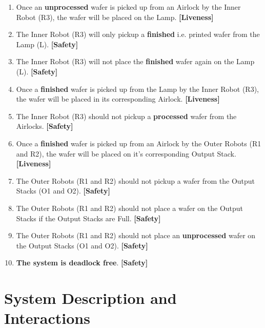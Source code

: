 \documentclass[a4paper,12pt]{article}
\begin{document}
\begin{enumerate}
\begin{enumerate}
		\end{enumerate}
		\item Once an \textbf{unprocessed} wafer is picked up from an Airlock by the Inner Robot (R3), the wafer will be placed on the Lamp. \textbf{[Liveness]}
		\item The Inner Robot (R3) will only pickup a \textbf{finished} i.e. printed wafer from the Lamp (L). \textbf{[Safety]}
		\item The Inner Robot (R3) will not place the \textbf{finished} wafer again on the Lamp (L). \textbf{[Safety]}
		\item Once a \textbf{finished} wafer is picked up from the Lamp by the Inner Robot (R3), the wafer will be placed in its corresponding Airlock. \textbf{[Liveness]}
		\item The Inner Robot (R3) should not pickup a \textbf{processed} wafer from the Airlocks. \textbf{[Safety]}
		\item Once a \textbf{finished} wafer is picked up from an Airlock by the Outer Robots (R1 and R2), the wafer will be placed on it's corresponding Output Stack. \textbf{[Liveness]}
		\item The Outer Robots (R1 and R2) should not pickup a wafer from the Output Stacks (O1 and O2). \textbf{[Safety]}
		\item The Outer Robots (R1 and R2) should not place a wafer on the Output Stacks if the Output Stacks are Full. \textbf{[Safety]}
		\item The Outer Robots (R1 and R2) should not place an \textbf{unprocessed} wafer on the Output Stacks (O1 and O2). \textbf{[Safety]}
		\item \textbf{The system is deadlock free}. \textbf{[Safety]}
		
	\end{enumerate}
	
	\newpage
	\section{System Description and Interactions}
\end{document}
